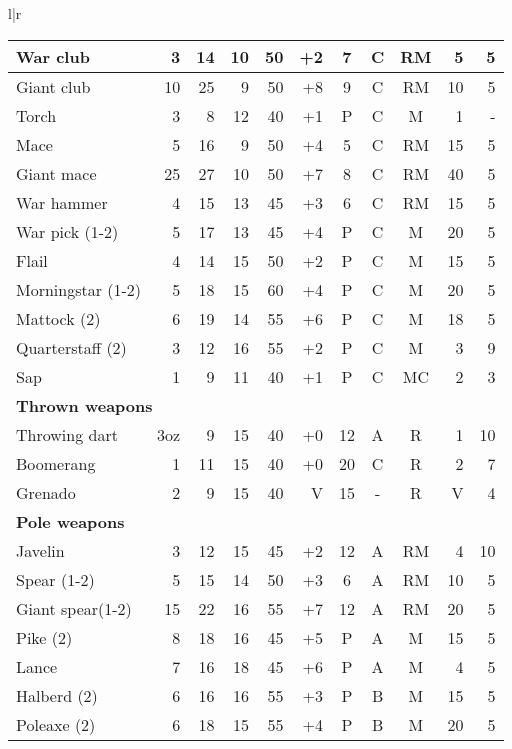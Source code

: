 \begin{tabular}[t]{l|r}
\begin{minipage}[t]{4.7in}
\begin{tabularx}{\linewidth}[t]{Xrrrrrcccrr}
War club	& 3	& 14	& 10	& 50	& +2	& 7	& C	& RM	& 5	& 5 \\ \hline
Giant club	& 10	& 25	& 9	& 50	& +8	& 9	& C	& RM	& 10	& 5 \\ \hline
Torch\footnotemark & 3	& 8	& 12	& 40	& +1	& P	& C	& M	& 1	& - \\ \hline
Mace		& 5	& 16	& 9	& 50	& +4	& 5	& C	& RM	& 15	& 5 \\ \hline
Giant mace\footnotemark[2]	& 25	& 27	& 10	& 50	& +7	& 8	& C	& RM	& 40	& 5 \\ \hline
War hammer	& 4	& 15	& 13	& 45	& +3	& 6	& C	& RM	& 15	& 5 \\ \hline
War pick (1-2)	& 5	& 17	& 13	& 45	& +4	& P	& C	& M	& 20	& 5 \\ \hline
Flail		& 4	& 14	& 15	& 50	& +2	& P	& C	& M	& 15	& 5 \\ \hline
Morningstar (1-2)& 5	& 18	& 15	& 60	& +4	& P	& C	& M	& 20	& 5 \\ \hline
Mattock (2)	& 6	& 19	& 14	& 55	& +6	& P	& C	& M	& 18	& 5 \\ \hline
Quarterstaff (2)& 3	& 12	& 16	& 55	& +2	& P	& C	& M	& 3	& 9 \\ \hline
Sap\footnotemark & 1	& 9	& 11	& 40	& +1	& P	& C	& MC	& 2	& 3 \\ \hline
\multicolumn{11}{l}{\textbf{Thrown weapons}\footnotemark} \\ \hline
Throwing dart\footnotemark &3oz&9& 15	& 40	& +0	& 12	& A	& R	& 1	& 10 \\ \hline
Boomerang\footnotemark & 1	& 11	& 15	& 40	& +0	& 20	& C	& R	& 2	& 7 \\ \hline
Grenado\footnotemark & 2	& 9	& 15	& 40	& V	& 15	& -	& R	& V	& 4 \\ \hline
\multicolumn{11}{l}{\textbf{Pole weapons}} \\ \hline
Javelin\footnotemark & 3	& 12	& 15	& 45	& +2	& 12	& A	& RM	& 4	& 10 \\ \hline
Spear (1-2)	& 5	& 15	& 14	& 50	& +3	& 6	& A	& RM	& 10	& 5 \\ \hline
Giant spear(1-2)\footnotemark[2] & 15	& 22	& 16	& 55	& +7	& 12	& A	& RM	& 20	& 5 \\ \hline
Pike (2)\footnotemark & 8	& 18	& 16	& 45	& +5	& P	& A	& M	& 15	& 5 \\ \hline
Lance\footnotemark & 7	& 16	& 18	& 45	& +6	& P	& A	& M	& 4	& 5 \\ \hline
Halberd (2)	& 6	& 16	& 16	& 55	& +3	& P	& B	& M	& 15	& 5 \\ \hline
Poleaxe (2)	& 6	& 18	& 15	& 55	& +4	& P	& B	& M	& 20	& 5 \\ \hline

\end{tabularx}
\end{minipage}
\end{tabular}
